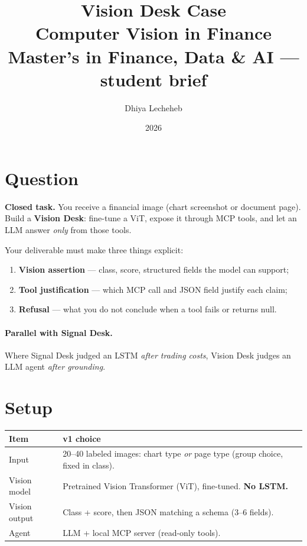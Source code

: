 \documentclass[11pt,a4paper]{article}
\title{%
  \textbf{Vision Desk Case}\\[0.35em]
  \large Computer Vision in Finance\\[0.5em]
  \normalsize Master's in Finance, Data \& AI --- student brief
}
\author{Dhiya Lecheheb}
\date{2026}
\begin{document}
\maketitle
\thispagestyle{empty}

\section{Question}

\textbf{Closed task.}
You receive a financial image (chart screenshot or document page).
Build a \textbf{Vision Desk}: fine-tune a ViT, expose it through MCP tools,
and let an LLM answer \emph{only} from those tools.

Your deliverable must make three things explicit:
\begin{enumerate}
  \item \textbf{Vision assertion} --- class, score, structured fields the model can support;
  \item \textbf{Tool justification} --- which MCP call and JSON field justify each claim;
  \item \textbf{Refusal} --- what you do not conclude when a tool fails or returns null.
\end{enumerate}

\paragraph{Parallel with Signal Desk.}
Where Signal Desk judged an LSTM \emph{after trading costs}, Vision Desk judges an
LLM agent \emph{after grounding}.

\section{Setup}

\begin{center}
\renewcommand{\arraystretch}{1.2}
\begin{tabular}{@{}p{3.2cm}p{11.4cm}@{}}
\toprule
\textbf{Item} & \textbf{v1 choice} \\
\midrule
Input & 20--40 labeled images: chart type \emph{or} page type (group choice, fixed in class). \\
Vision model & Pretrained Vision Transformer (ViT), fine-tuned. \textbf{No LSTM.} \\
Vision output & Class + score, then JSON matching a schema (3--6 fields). \\
Agent & LLM + local MCP server (read-only tools). \\
\bottomrule
\end{tabular}
\end{center}
\end{document}
